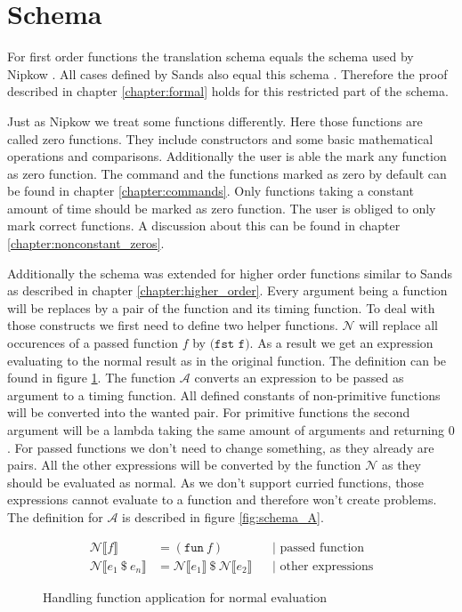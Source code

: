 
\section{Schema} \label{chapter:impl_schema}

For first order functions the translation schema equals the schema used by Nipkow \parencite{fds}.
All cases defined by Sands also equal this schema \parencite{sands}.
Therefore the proof described in chapter \ref{chapter:formal} holds for this restricted part of the schema.

Just as Nipkow we treat some functions differently.
Here those functions are called zero functions.
They include constructors and some basic mathematical operations and comparisons.
Additionally the user is able the mark any function as zero function.
The command and the functions marked as zero by default can be found in chapter \ref{chapter:commands}.
Only functions taking a constant amount of time should be marked as zero function.
The user is obliged to only mark correct functions.
A discussion about this can be found in chapter \ref{chapter:nonconstant_zeros}.

Additionally the schema was extended for higher order functions similar to Sands as described in chapter \ref{chapter:higher_order}.
Every argument being a function will be replaces by a pair of the function and its timing function.
To deal with those constructs we first need to define two helper functions.
$\mathcal{N}$ will replace all occurences of a passed function $f$ by $\texttt{(fst f)}$.
As a result we get an expression evaluating to the normal result as in the original function.
The definition can be found in figure \ref{fig:schema_N}.
The function $\mathcal{A}$ converts an expression to be passed as argument to a timing function.
All defined constants of non-primitive functions will be converted into the wanted pair.
For primitive functions the second argument will be a lambda taking the same amount of arguments and returning $0$.
For passed functions we don't need to change something, as they already are pairs.
All the other expressions will be converted by the function $\mathcal{N}$ as they should be evaluated as normal.
As we don't support curried functions, those expressions cannot evaluate to a function and therefore won't create problems.
The definition for $\mathcal{A}$ is described in figure \ref{fig:schema_A}.
\begin{figure}
\begin{align*}
  \mathcal{N}\llbracket f\rrbracket &= (\texttt{fun}\ f) &&\text{| passed function}\\
  \mathcal{N}\llbracket e_{1}\ \$\ e_{n}\rrbracket &= \mathcal{N}\llbracket e_{1}\rrbracket\ \$\ \mathcal{N}\llbracket e_{2}\rrbracket &&\text{| other expressions}
\end{align*}
\caption{Handling function application for normal evaluation}
\label{fig:schema_N}
\end{figure}

